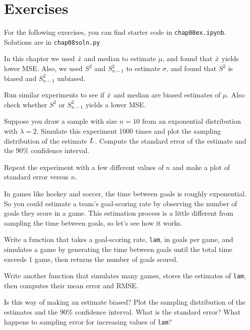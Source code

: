 \documentclass[12pt]{book}
\begin{document}
\section{Exercises}

For the following exercises, you can find starter code in
\verb"chap08ex.ipynb".  Solutions are in \verb"chap08soln.py"

\begin{exercise}

In this chapter we used $\bar{x}$ and median to estimate $\mu$, and
found that $\bar{x}$  yields lower MSE.
Also, we used $S^2$ and $S_{n-1}^2$ to estimate $\sigma$, and found that
$S^2$ is biased and $S_{n-1}^2$ unbiased.

Run similar experiments to see if $\bar{x}$ and median are biased estimates
of $\mu$.
Also check whether $S^2$ or $S_{n-1}^2$ yields a lower MSE.

\end{exercise}


\begin{exercise}

Suppose you draw a sample with size $n=10$ from 
an exponential distribution with $\lambda=2$.  Simulate
this experiment 1000 times and plot the sampling distribution of
the estimate $L$.  Compute the standard error of the estimate
and the 90\% confidence interval.

Repeat the experiment with a few different values of $n$ and make
a plot of standard error versus $n$.


\end{exercise}


\begin{exercise}

In games like hockey and soccer, the time between goals is
roughly exponential.  So you could estimate a team's goal-scoring rate
by observing the number of goals they score in a game.  This
estimation process is a little different from sampling the time
between goals, so let's see how it works.

Write a function that takes a goal-scoring rate, \verb"lam", in goals
per game, and simulates a game by generating the time between goals
until the total time exceeds 1 game, then returns the number of goals
scored.

Write another function that simulates many games, stores the
estimates of \verb"lam", then computes their mean error and RMSE.

Is this way of making an estimate biased?  Plot the sampling
distribution of the estimates and the 90\% confidence interval.  What
is the standard error?  What happens to sampling error for increasing
values of \verb"lam"?

\end{exercise}
\end{document}
